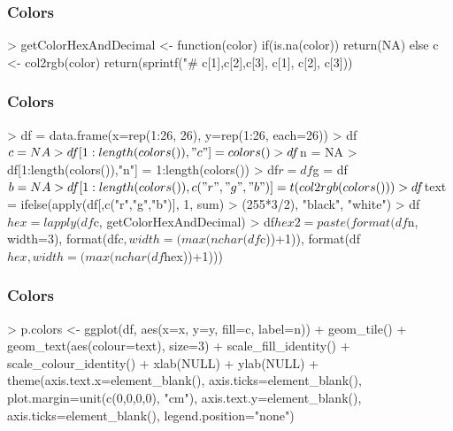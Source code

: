 \documentclass[10pt,slidestop,mathserif,c]{beamer}
\begin{document}
\begin{frame}
    \frametitle{Colors}
\begin{Schunk}
\begin{Sinput}
> getColorHexAndDecimal <- function(color) {
   	if(is.na(color)) {
   		return(NA)
   	} else {
   		c <- col2rgb(color)
   		return(sprintf("#%
   		    c[1],c[2],c[3], c[1], c[2], c[3]))
   	}
   }
\end{Sinput}
\end{Schunk}
\end{frame}

\begin{frame}
    \frametitle{Colors}
\begin{Schunk}
\begin{Sinput}
> df = data.frame(x=rep(1:26, 26), y=rep(1:26, each=26))
> df$c = NA
> df[1:length(colors()),"c"] = colors()
> df$n = NA
> df[1:length(colors()),"n"] = 1:length(colors())
> df$r = df$g = df$b = NA
> df[1:length(colors()),c("r","g","b")] = t(col2rgb(colors()))
> df$text = ifelse(apply(df[,c("r","g","b")], 1, sum) > 
       (255*3/2), "black", "white")
> df$hex = lapply(df$c, getColorHexAndDecimal)
> df$hex2 = paste(format(df$n, width=3), 
       format(df$c, width=(max(nchar(df$c))+1)), 
       format(df$hex, width=(max(nchar(df$hex))+1)))
\end{Sinput}
\end{Schunk}
\end{frame}

\begin{frame}
    \frametitle{Colors}
\begin{Schunk}
\begin{Sinput}
> p.colors <- ggplot(df, aes(x=x, y=y, fill=c, label=n)) + 
       geom_tile() + 
   	geom_text(aes(colour=text), size=3) + 
   	scale_fill_identity() +
   	scale_colour_identity() +
   	xlab(NULL) + ylab(NULL) +
   	theme(axis.text.x=element_blank(), 
   	      axis.ticks=element_blank(), 
   		  plot.margin=unit(c(0,0,0,0), "cm"),
   		  axis.text.y=element_blank(), 
   		  axis.ticks=element_blank(), 
   		  legend.position="none")
\end{Sinput}
\end{Schunk}
\end{frame}
\end{document}
